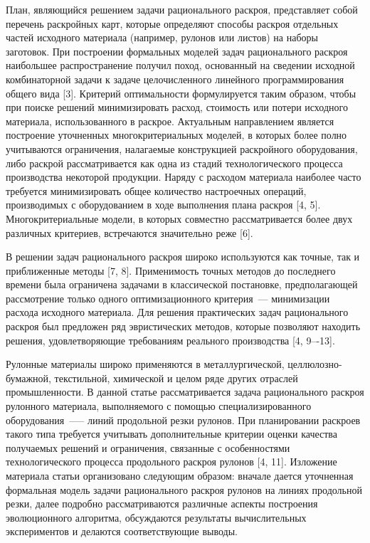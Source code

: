 \documentclass[12pt]{article}
\begin{document}
План, являющийся решением задачи рационального раскроя, представляет собой 
перечень раскройных карт, которые определяют способы раскроя отдельных частей 
исходного материала (например, рулонов или листов) на наборы заготовок. При 
построении формальных моделей задач рационального раскроя наибольшее 
распространение получил поход, основанный на сведении исходной комбинаторной 
задачи к задаче целочисленного линейного программирования общего вида [3]. 
Критерий оптимальности формулируется таким образом, чтобы при поиске решений 
минимизировать расход, стоимость или потери исходного материала, 
использованного в раскрое. Актуальным направлением является построение 
уточненных многокритериальных моделей, в которых более полно учитываются 
ограничения, налагаемые конструкцией раскройного оборудования, либо раскрой 
рассматривается как одна из стадий технологического процесса производства 
некоторой продукции. Наряду с расходом материала наиболее часто требуется 
минимизировать общее количество настроечных операций, производимых с 
оборудованием в ходе выполнения плана раскроя [4, 5]. Многокритериальные 
модели, в которых совместно рассматривается более двух различных критериев, 
встречаются значительно реже [6].

В решении задач рационального раскроя широко используются как точные, так и 
приближенные методы [7, 8]. Применимость точных методов до последнего времени 
была ограничена задачами в классической постановке, предполагающей рассмотрение 
только одного оптимизационного критерия~--- минимизации расхода исходного 
материала. Для решения практических задач рационального раскроя был предложен 
ряд эвристических методов, которые позволяют находить решения, удовлетворяющие 
требованиям реального производства [4, 9–-13].

Рулонные материалы широко применяются в металлургической, целлюлозно-бумажной, 
текстильной, химической и целом ряде других отраслей промышленности. В данной 
статье рассматривается задача рационального раскроя рулонного материала, 
выполняемого с помощью специализированного оборудования~--— линий продольной 
резки рулонов. При планировании раскроев такого типа требуется учитывать 
дополнительные критерии оценки качества получаемых решений и ограничения, 
связанные с особенностями технологического процесса продольного раскроя 
рулонов [4, 11]. Изложение материала статьи организовано следующим образом: 
вначале дается уточненная формальная модель задачи рационального раскроя 
рулонов на линиях продольной резки, далее подробно рассматриваются различные 
аспекты построения эволюционного алгоритма, обсуждаются результаты 
вычислительных экспериментов и делаются соответствующие выводы.
\end{document}
